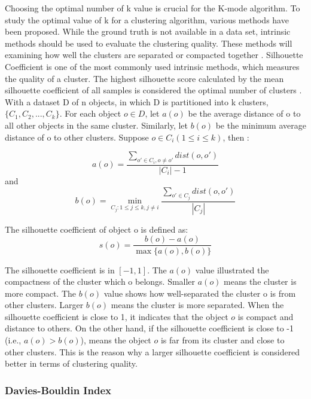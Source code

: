 \documentclass[12pt]{article}
\begin{document}
\noindent Choosing the optimal number of k value is crucial for the 
K-mode algorithm. To study the optimal value of k for a clustering algorithm, 
various methods have been proposed. While the ground truth is not available
in a data set, intrinsic methods should be used to evaluate the 
clustering quality. These methods will examining how well the clusters
are separated or compacted together \citep{2012vi}. Silhouette Coefficient is one of the most
commonly used intrinsic methods, which measures the quality of a cluster. The highest
silhouette score calculated by the mean silhouette coefficient of all samples
is considered the optimal number of clusters \citep{9260048}. \\

\noindent With a dataset D of n objects, in which D is partitioned into 
k clusters, $\{C_1,C_2,...,C_k\}$. For each object $o \in D$, 
let $a(o)$ be the average distance of o to all other objects in the same cluster.
Similarly, let $b(o)$ be the minimum average distance of o to other clusters.
Suppose $o \in C_i(1 \leq i \leq k )$, then \citep{2012vi}: 

$$a(o) = \frac{\sum_{o' \in C_i , o \neq o'} dist(o,o')}{|C_i| - 1}$$
and
$$b(o) = \min_{C_j: 1 \leq j \leq k, j \neq i} \frac{\sum_{o' \in C_j} dist(o,o')}{|C_j|}$$

The silhouette coefficient of object o is defined as:
$$s(o) = \frac{b(o) - a(o)}{\max\{a(o),b(o)\}}$$

\noindent The silhouette coefficient is in $[-1,1]$. The $a(o)$ value illustrated
the compactness of the cluster which o belongs. Smaller $a(o)$ means the
cluster is more compact. The $b(o)$ value shows how well-separated the 
cluster o is from other clusters. Larger $b(o)$ means the cluster is
more separated. When the silhouette coefficient is close to 1, it indicates
that the object $o$ is compact and distance to others. On the other hand, 
if the silhouette coefficient is close to -1 (i.e., $a(o) > b(o)$), means
the object $o$ is far from its cluster and close to other clusters. This is
the reason why a larger silhouette coefficient is considered better in terms of
clustering quality. 


\subsubsection{Davies-Bouldin Index}
\end{document}
